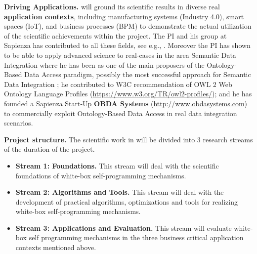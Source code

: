 

\textbf{Driving Applications.}  \project will ground its scientific results in
diverse real \textbf{application contexts}, including manufacturing
systems (Industry 4.0), smart spaces (IoT), and business processes
(BPM) to demonstrate the actual utilization of the scientific
achievements within the project.  The PI and his group at Sapienza has
contributed to all these fields, see e.g.,
\cite{DeGiacomoCFHM12,DeGiacomoDMM15,SilvaFCLSR17}.  Moreover the PI
has shown to be able to apply advanced science to real-cases in the
area Semantic Data Integration where he has been as one of the main
proposers of the Ontology-Based Data Access paradigm, possibly the
most successful approach for Semantic Data Integration \cite{PoggiLCGLR08,SequedaM17,Statoil17}; he
contributed to W3C recommendation of OWL 2 Web Ontology Language
Profiles (\url{https://www.w3.org/TR/owl2-profiles/}); and he has
founded a Sapienza Start-Up \textbf{OBDA Systems}
(\url{http://www.obdasystems.com}) to  commercially exploit Ontology-Based Data Access  in real data integration scenarios. 




\textbf{Project structure.}
The scientific work in \project will be divided into 3 research streams of the duration of the  project.
\begin{itemize}
\item \textbf{Stream 1: Foundations.} This stream will deal with the
scientific foundations of white-box self-programming mechanisms. 

\item \textbf{Stream 2: Algorithms and Tools.}  This stream  will deal with the
development of practical algorithms, optimizations and tools for realizing
white-box self-programming mechanisms. 

\item \textbf{Stream 3: Applications and Evaluation.}  This stream  will evaluate white-box self programming mechanisms in the three business critical application contexts mentioned above.
\end{itemize}



